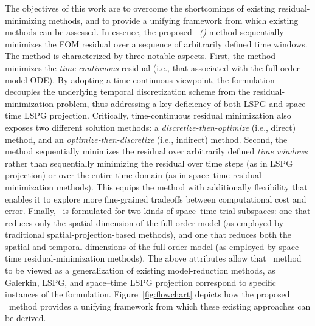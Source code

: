\documentclass[3p,computermodern,10pt]{elsarticle}
\begin{document}
The objectives of this work are to overcome the shortcomings of existing
residual-minimizing methods, and to provide a unifying framework from which
existing methods can be assessed. In essence, the proposed  \textit{\methodNameLower\
(\methodAcronym)} method sequentially minimizes the FOM
residual over a sequence of arbitrarily defined
time windows. The method is characterized by three notable aspects.  First, the method
minimizes the \textit{time-continuous}  residual (i.e., that associated with
the full-order model ODE). By adopting a time-continuous viewpoint, the
formulation decouples the underlying temporal discretization scheme from the
residual-minimization problem, thus addressing a key deficiency of both LSPG
and space--time LSPG projection. Critically, time-continuous residual minimization also exposes
two different solution methods:  a \textit{discretize-then-optimize}
(i.e., direct) method, and an \textit{optimize-then-discretize} (i.e.,
indirect) method. Second, the method sequentially minimizes
the residual over arbitrarily defined \textit{time windows} rather than
sequentially minimizing the residual over time steps (as in LSPG projection)
or over the entire time domain (as in space--time residual-minimization
methods). This equips the method with additionally flexibility that enables it
to explore more fine-grained tradeoffs between computational cost and error.
Finally, \methodAcronym\ is formulated for two kinds of space--time trial
subspaces: one that reduces only the spatial dimension of the full-order
model (as employed by traditional spatial-projection-based methods), and one that reduces both the spatial and temporal dimensions of the
full-order model (as employed by space--time residual-minimization methods).
The above attributes allow that \methodAcronym\ method to be viewed as a
generalization of existing model-reduction methods, as 
Galerkin, LSPG, and space--time LSPG projection correspond to specific
instances of the formulation.
Figure~\ref{fig:flowchart} depicts how the proposed \methodAcronym\ method
provides a unifying framework from which these existing approaches can be derived.
\end{document}
